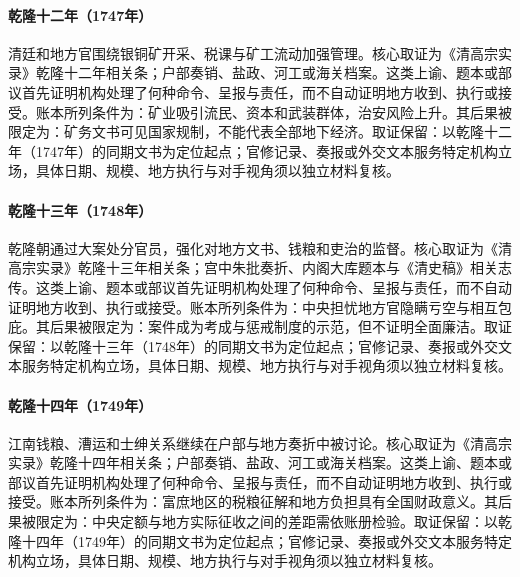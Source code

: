 \hypertarget{ledger:EQ-1747-SOUTHWEST-MINING-REGULATION}{}\paragraph{乾隆十二年（1747年）}清廷和地方官围绕银铜矿开采、税课与矿工流动加强管理。核心取证为《清高宗实录》乾隆十二年相关条；户部奏销、盐政、河工或海关档案。这类上谕、题本或部议首先证明机构处理了何种命令、呈报与责任，而不自动证明地方收到、执行或接受。账本所列条件为：矿业吸引流民、资本和武装群体，治安风险上升。其后果被限定为：矿务文书可见国家规制，不能代表全部地下经济。取证保留：以乾隆十二年（1747年）的同期文书为定位起点；官修记录、奏报或外交文本服务特定机构立场，具体日期、规模、地方执行与对手视角须以独立材料复核。
\hypertarget{ledger:EQ-1748-SONG-AND-CASE}{}\paragraph{乾隆十三年（1748年）}乾隆朝通过大案处分官员，强化对地方文书、钱粮和吏治的监督。核心取证为《清高宗实录》乾隆十三年相关条；宫中朱批奏折、内阁大库题本与《清史稿》相关志传。这类上谕、题本或部议首先证明机构处理了何种命令、呈报与责任，而不自动证明地方收到、执行或接受。账本所列条件为：中央担忧地方官隐瞒亏空与相互包庇。其后果被限定为：案件成为考成与惩戒制度的示范，但不证明全面廉洁。取证保留：以乾隆十三年（1748年）的同期文书为定位起点；官修记录、奏报或外交文本服务特定机构立场，具体日期、规模、地方执行与对手视角须以独立材料复核。
\hypertarget{ledger:EQ-1749-JIANGNAN-TAX-REVIEW}{}\paragraph{乾隆十四年（1749年）}江南钱粮、漕运和士绅关系继续在户部与地方奏折中被讨论。核心取证为《清高宗实录》乾隆十四年相关条；户部奏销、盐政、河工或海关档案。这类上谕、题本或部议首先证明机构处理了何种命令、呈报与责任，而不自动证明地方收到、执行或接受。账本所列条件为：富庶地区的税粮征解和地方负担具有全国财政意义。其后果被限定为：中央定额与地方实际征收之间的差距需依账册检验。取证保留：以乾隆十四年（1749年）的同期文书为定位起点；官修记录、奏报或外交文本服务特定机构立场，具体日期、规模、地方执行与对手视角须以独立材料复核。
